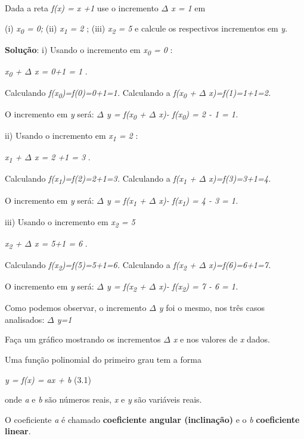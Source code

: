 \begin{texemplo}
Dada a reta \textit{f(x) = x +1 }   use o incremento \textit{$ \Delta $ x = 1 }  em

 (i) \textit{x\textsubscript{0} = 0;   }(ii)\textit{ x\textsubscript{1} = 2}  ; (iii) \textit{x\textsubscript{2} = 5 } e calcule os respectivos incrementos em \textit{y}. 

\textbf{Solução}: i) Usando o incremento em  \textit{x\textsubscript{0} = 0} :  

\textit{ x\textsubscript{0} + $ \Delta $ x = 0+1 = 1} .  

Calculando  \textit{f(x\textsubscript{0})=f(0)=0+1=1.}   Calculando a\textit{ f(x\textsubscript{0} + $ \Delta $ x)=f(1)=1+1=2.}

O incremento em \textit{y} será:\textit{  $ \Delta $ y =  f(x\textsubscript{0} + $ \Delta $ x)- f(x\textsubscript{0}) =  2 - 1 = 1.}

ii) Usando o incremento em  \textit{x\textsubscript{1} = 2} :  

\textit{x\textsubscript{1} + $ \Delta $ x = 2 +1  = 3} .  

Calculando  \textit{f(x\textsubscript{1})=f(2)=2+1=3.}   Calculando a\textit{ f(x\textsubscript{1} + $ \Delta $ x)=f(3)=3+1=4.}

O incremento em \textit{y} será:\textit{  $ \Delta $ y =  f(x\textsubscript{1} + $ \Delta $ x)- f(x\textsubscript{1}) =  4 - 3 = 1.  }

iii) Usando o incremento em  \textit{x\textsubscript{2} = 5 } 

\textit{x\textsubscript{2} + $ \Delta $ x = 5+1  = 6} .  

Calculando  \textit{f(x\textsubscript{2})=f(5)=5+1=6.}   Calculando a\textit{ f(x\textsubscript{2} + $ \Delta $ x)=f(6)=6+1=7.}

O incremento em \textit{y} será:\textit{  $ \Delta $ y =  f(x\textsubscript{2} + $ \Delta $ x)- f(x\textsubscript{2}) =  7 - 6 = 1.  }

Como podemos observar, o incremento \textit{$ \Delta $ y}  foi o mesmo, nos três casos analisados: \textit{$ \Delta $ y=1}

Faça um gráfico mostrando os incrementos \textit{$ \Delta $ x} e  nos valores de \textit{x} dados.\qedsymbol{}
\end{texemplo}

\begin{caixa}
\begin{tdefinicao}
Uma função polinomial do primeiro grau tem a forma

\textit{y = f(x) = ax + b} \tab (3.1)

onde \textit{a} e \textit{b} são números reais, \textit{x} e \textit{y} são variáveis reais.

O coeficiente \textit{a}  é chamado \textbf{coeficiente angular (inclinação)} e o \textit{b} \textbf{coeficiente linear}.
\end{tdefinicao}
\end{caixa}

